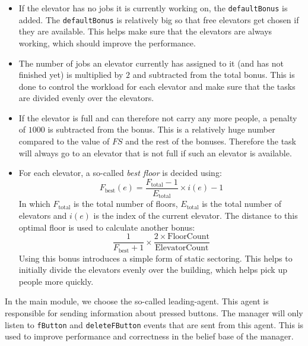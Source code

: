 \documentclass[a4paper,10pt,twocolumn]{article}
\begin{document}
\begin{itemize}
 \item If the elevator has no jobs it is currently working on, the \texttt{defaultBonus} is added. The \texttt{defaultBonus} is relatively big so that free elevators get chosen if they are available. This helps make sure that the elevators are always working, which should improve the performance.
 
 \item The number of jobs an elevator currently has assigned to it (and has not finished yet) is multiplied by $2$ and subtracted from the total bonus. This is done to control the workload for each elevator and make sure that the tasks are divided evenly over the elevators.
 
 \item If the elevator is full and can therefore not carry any more people, a penalty of $1000$ is subtracted from the bonus. This is a relatively huge number compared to the value of $FS$ and the rest of the bonuses. Therefore the task will always go to an elevator that is not full if such an elevator is available.
 
 \item For each elevator, a so-called \emph{best floor} is decided using:
 \begin{equation}
  \label{eq:best_floor}
  F_\text{best} (e) = \frac{F_\text{total} - 1}{E_\text{total}} \times i(e) - 1
 \end{equation}
 In which $F_\text{total}$ is the total number of floors, $E_\text{total}$ is the total number of elevators and $i(e)$ is the index of the current elevator.
 The distance to this optimal floor is used to calculate another bonus:
 \begin{equation}
  \frac{1}{F_\text{best} + 1} \times \frac{2 \times \text{FloorCount}}{\text{ElevatorCount}}
 \end{equation}
 Using this bonus introduces a simple form of static sectoring. This helps to initially divide the elevators evenly over the building, which helps pick up people more quickly.
\end{itemize}

In the main module, we choose the so-called leading-agent. This agent is responsible for sending information about pressed buttons. The manager will only listen to \texttt{fButton} and \texttt{deleteFButton} events that are sent from this agent. This is used to improve performance and correctness in the belief base of the manager. 
\end{document}
